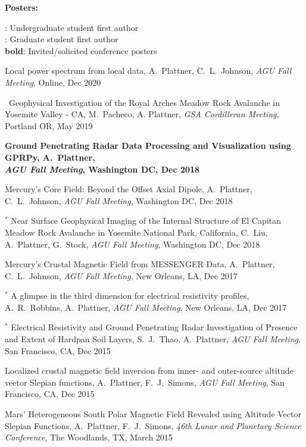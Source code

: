\documentclass[10pt]{article}
\begin{document}
\spc
\textbf{\tsize Posters:}

\spcp
\ug: Undergraduate student first author\\
\gr: Graduate student first author\\
\textbf{bold}: Invited/solicited conference posters

\spcp
Local power spectrum from local data,
A.~Plattner, C.~L.~Johnson, 
\emph{AGU Fall Meeting}, Online, Dec 2020 

\spcp
\hspace*{-0.4cm} \gr \, Geophysical Investigation of the Royal Arches Meadow Rock
Avalanche in Yosemite Valley - CA,
M.~Pacheco, A. Plattner,
\emph{GSA Cordilleran Meeting}, Portland OR, May 2019

\spcp
\textbf{Ground Penetrating Radar Data Processing and Visualization using
GPRPy,
A.~Plattner,\\
\emph{AGU Fall Meeting}, Washington DC, Dec 2018}

\spcp
Mercury's Core Field: Beyond the Offset Axial Dipole,
A.~Plattner, C.~L.~Johnson, 
\emph{AGU Fall Meeting}, Washington DC, Dec 2018 

\spcp
\hspace{-0.4cm} $^*$ Near Surface Geophysical Imaging of the Internal
Structure of El Capitan Meadow Rock Avalanche in Yosemite National
Park, California,
C.~Liu, A.~Plattner, G.~Stock,
\emph{AGU Fall Meeting}, Washington DC, Dec 2018


\spcp
Mercury's Crustal Magnetic Field from MESSENGER Data,
 A.~Plattner, C.~L.~Johnson, 
\emph{AGU Fall Meeting}, New Orleans, LA, Dec 2017 

\spcp
\hspace{-0.4cm} $^*$ A glimpse in the third dimension for electrical
resistivity profiles,
A.~R.~Robbins, A.~Plattner,
\emph{AGU Fall Meeting}, New Orleans, LA, Dec 2017 

\spcp
\hspace{-0.4cm} $^*$ Electrical Resistivity and Ground Penetrating Radar 
Investigation of Presence and Extent of Hardpan Soil Layers,
 S.~J.~Thao, A.~Plattner,
\emph{AGU Fall Meeting}, San Francisco, CA, Dec 2015

\spcp
Localized crustal magnetic field inversion from inner- and outer-source altitude vector Slepian functions,
A.~Plattner,  F.~J.~Simons,
\emph{AGU Fall Meeting}, San Francisco, CA, Dec 2015

\spcp
Mars' Heterogeneous South Polar Magnetic Field Revealed using Altitude Vector Slepian Functions,
A.~Plattner,  F.~J.~Simons,
\emph{46th Lunar and Planetary Science Conference}, The Woodlands, TX, March 2015
\end{document}
